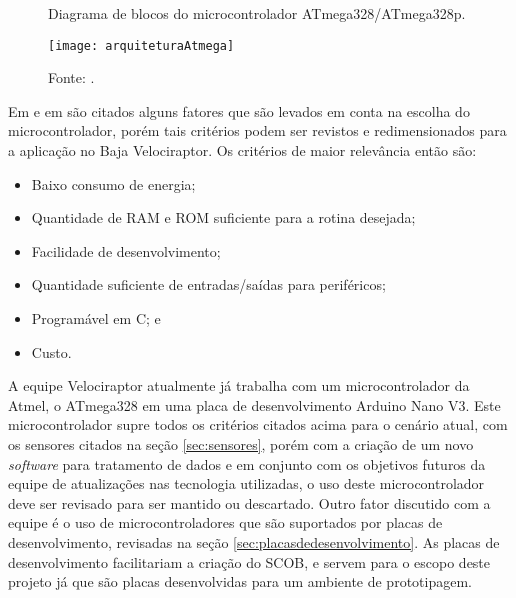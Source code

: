 \begin{figure}[!htb]
	\centering
		\caption{Diagrama de blocos do microcontrolador ATmega328/ATmega328p.}
		\texttt{[image: arquiteturaAtmega]} 
		\caption*{Fonte: \cite{atmel}.}
		\label{fig:arquiteturaAtmega}
\end{figure} 

Em  e em  são citados alguns fatores que são levados em conta na escolha do microcontrolador, porém tais critérios podem ser revistos e redimensionados para a aplicação no Baja Velociraptor. Os critérios de maior relevância então são:

\begin{itemize}
	\item Baixo consumo de energia;
	\item Quantidade de RAM e ROM suficiente para a rotina desejada;
	\item Facilidade de desenvolvimento;
	\item Quantidade suficiente de entradas/saídas para periféricos; 
	\item Programável em C; e
	\item Custo.
\end{itemize}   

A equipe Velociraptor atualmente já trabalha com um microcontrolador da Atmel, o ATmega328 em uma placa de desenvolvimento Arduino Nano V3. Este microcontrolador supre todos os critérios citados acima para o cenário atual, com os sensores citados na seção \ref{sec:sensores}, porém com a criação de um novo \textit{software} para tratamento de dados e em conjunto com os objetivos futuros da equipe de atualizações nas tecnologia utilizadas, o uso deste microcontrolador deve ser revisado para ser mantido ou descartado. Outro fator discutido com a equipe é o uso de microcontroladores que são suportados por placas de desenvolvimento, revisadas na seção \ref{sec:placasdedesenvolvimento}. As placas de desenvolvimento facilitariam a criação do SCOB, e servem para o escopo deste projeto já que são placas desenvolvidas para um ambiente de prototipagem. 

